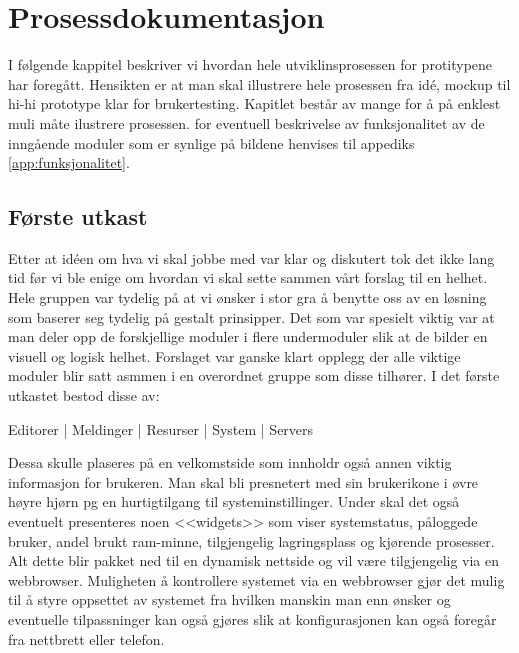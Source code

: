 \chapter{Prosessdokumentasjon}
\lettrine[lines=2]{I}{} følgende kappitel beskriver vi hvordan hele utviklinsprosessen for protitypene har foregått. Hensikten er at man skal illustrere hele prosessen fra idé, mockup til hi-hi prototype klar for brukertesting. Kapitlet består av mange for å på enklest muli måte ilustrere prosessen. for eventuell beskrivelse av funksjonalitet av de inngående moduler som er synlige på bildene henvises til appediks \ref{app:funksjonalitet}.




\section{Første utkast}
Etter at idéen om hva vi skal jobbe med var klar og diskutert tok det ikke lang tid før vi ble enige om hvordan vi skal sette sammen vårt forslag til en helhet. Hele gruppen var tydelig på at vi ønsker i stor gra å benytte oss av en løsning som baserer seg tydelig på gestalt prinsipper.
Det som var spesielt viktig var at man deler opp de forskjellige moduler i flere undermoduler slik at de bilder en visuell og logisk helhet. 
Forslaget var ganske klart opplegg der alle viktige moduler blir satt asmmen i en overordnet gruppe som disse tilhører. I det første utkastet bestod disse av:
\begin{center}
Editorer | Meldinger | Resurser | System | Servers
\end{center}
Dessa skulle plaseres på en velkomstside som innholdr også annen viktig informasjon for brukeren. Man skal bli presnetert med sin brukerikone i øvre høyre hjørn pg en hurtigtilgang til systeminstillinger. Under skal det også eventuelt presenteres noen <<widgets>> som viser systemstatus, påloggede bruker, andel brukt ram-minne, tilgjengelig lagringsplass og kjørende prosesser. Alt dette blir pakket ned til en dynamisk nettside og vil være tilgjengelig via en webbrowser. Muligheten å kontrollere systemet via en webbrowser gjør det mulig til å styre oppsettet av systemet fra hvilken manskin man enn ønsker og eventuelle tilpassninger kan også gjøres slik at konfigurasjonen kan også foregår fra nettbrett eller telefon.

